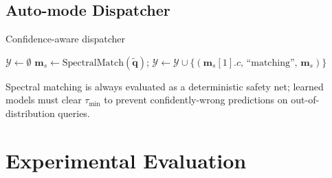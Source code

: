 \documentclass[10pt,aspectratio=169,xcolor=dvipsnames]{beamer}
\begin{document}
\subsection{Auto-mode Dispatcher}

\begin{frame}{Confidence-aware dispatcher}
  \begin{algorithm}[H]
    \footnotesize
    \DontPrintSemicolon
    $\mathcal{Y} \gets \emptyset$\;
    $\mathbf{m}_s \gets \mathrm{SpectralMatch}(\tilde{\mathbf{q}})$;\quad
      $\mathcal{Y} \gets \mathcal{Y} \cup \{(\mathbf{m}_s[1].c,\,\text{``matching''},\,\mathbf{m}_s)\}$\;
    \;
    \caption{\textsc{AutoIdentify} — selects the most confident identifier per query.}
  \end{algorithm}
  \smallskip
  Spectral matching is always evaluated as a deterministic safety net;
  learned models must clear $\tau_{\min}$ to prevent confidently-wrong
  predictions on out-of-distribution queries.
\end{frame}

\section{Experimental Evaluation}
\end{document}
